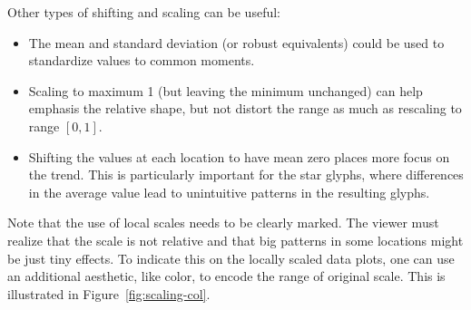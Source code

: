 \documentclass[oneside]{article}
\begin{document}
Other types of shifting and scaling can be useful:

\begin{itemize}

  \item The mean and standard deviation (or robust equivalents) could be used
  to standardize values to common moments.
  
   \item Scaling to maximum 1 (but leaving the minimum unchanged) can help
  emphasis the relative shape, but not distort the range as much as rescaling
  to range $[0, 1]$.

  \item Shifting the values at each location to have mean zero places more
  focus on the trend. This is particularly important for the star glyphs,
  where differences in the average value lead to unintuitive patterns in the
  resulting glyphs.

\end{itemize}

Note that the use of local scales needs to be clearly marked. The viewer must realize that the scale is not relative and that big patterns in some locations might be just tiny effects. To indicate this on the locally scaled data plots, one can use an additional aesthetic, like color, to encode the range of original scale. This is illustrated in Figure~\ref{fig:scaling-col}.
\end{document}

